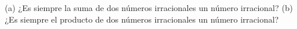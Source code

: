 \item (a) ¿Es siempre la suma de dos números irracionales un número irracional? (b) ¿Es siempre el producto de dos números irracionales un número irracional?

